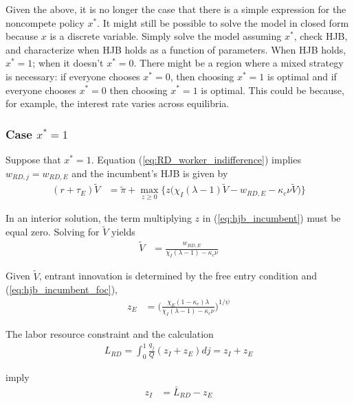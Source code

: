 \documentclass[12pt,english]{article}
\theoremstyle{remark}
\begin{document}
Given the above, it is no longer the case that there is a simple expression for the noncompete policy $x^*$. It might still be possible to solve the model in closed form because $x$ is a discrete variable. Simply solve the model assuming $x^*$, check HJB, and characterize when HJB holds as a function of parameters. When HJB holds, $x^* = 1$; when it doesn't $x^* = 0$. There might be a region where a mixed strategy is necessary: if everyone chooses $x^* = 0$, then choosing $x^* = 1$ is optimal and if everyone chooses $x^* = 0$ then choosing $x^* = 1$ is optimal. This could be because, for example, the interest rate varies across equilibria.

\subsubsection{Case $x^* = 1$}

Suppose that $x^* = 1$. Equation (\ref{eq:RD_worker_indifference}) implies $w_{RD,j} = w_{RD,E}$ and the incumbent's HJB is given by 
\begin{align}
(r + \tau_E) \tilde{V} &= \tilde{\pi} + \max_{z \ge 0} \Big\{z \big(\chi_I (\lambda - 1) \tilde{V} - w_{RD,E} - \kappa_{c} \nu \tilde{V}\big) \Big\} \label{eq:hjb_incumbent}
\end{align}

In an interior solution, the term multiplying $z$ in (\ref{eq:hjb_incumbent}) must be equal zero. Solving for $\tilde{V}$ yields
\begin{align}
	\tilde{V} &= \frac{w_{RD,E}}{\chi_I(\lambda - 1) - \kappa_{c} \nu} \label{eq:hjb_incumbent_foc}
\end{align}

Given $\tilde{V}$, entrant innovation is determined by the free entry condition and (\ref{eq:hjb_incumbent_foc}),
\begin{align}
	z_E &= \Big( \frac{\chi_E (1-\kappa_{e}) \lambda}{\chi_I(\lambda-1) - \kappa_c \nu } \Big)^{1/\psi} \label{eq:effort_entrant}
\end{align}

The labor resource constraint and the calculation
\begin{align}
	L_{RD} = \int_0^1 \frac{q_j}{Q} (z_{I} + z_{E}) dj = z_I + z_E
\end{align}
 
imply 
\begin{align}
	z_I &= \bar{L}_{RD} - z_E \label{eq:zI_asFuncZe}
\end{align}
\end{document}
